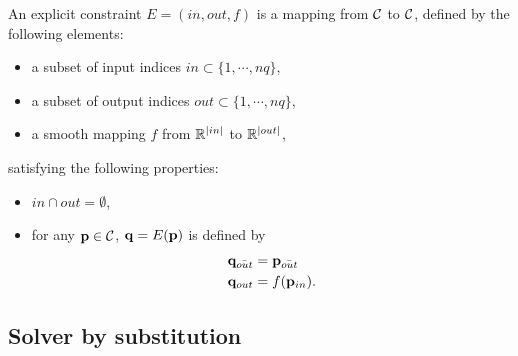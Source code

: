 \begin{definition}\label{def:Explicit}
An explicit constraint $E=(in, out, f)$ is a mapping from $\mathcal{C}$ to $\mathcal{C}$, defined by the following elements:
\begin{itemize}
\item a subset of input indices $in\subset\{1,\cdots, nq\}$,
\item a subset of output indices $out\subset\{1,\cdots, nq\}$,
\item a smooth mapping $f$ from $\mathbb{R}^{|in|}$ to $\mathbb{R}^{|out|}$,
\end{itemize}
satisfying the following properties:
\begin{itemize}
\item $in\cap out = \emptyset$,
\item for any $\mathbf{p}\in\mathcal{C}$, $\mathbf{q} = E(\mathbf{p})$ is defined by
  \begin{align*}
    &\mathbf{q}_{\bar{out}} = \mathbf{p}_{\bar{out}}\\
    &\mathbf{q}_{out} = f (\mathbf{p}_{in}).
  \end{align*}
\end{itemize}
\end{definition}

\subsection{Solver by substitution}

